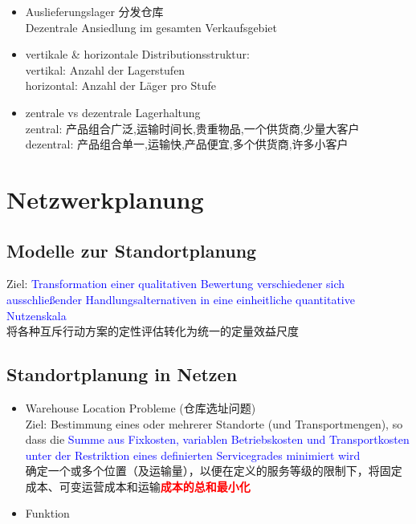 \documentclass[12pt, letterpaper]{article}
\begin{document}
\begin{CJK*}{UTF8}{gbsn}
\begin{itemize}
\item Auslieferungslager 分发仓库\\
Dezentrale Ansiedlung im gesamten Verkaufsgebiet\\

\item vertikale \& horizontale Distributionsstruktur:\\[1mm]
vertikal: Anzahl der Lagerstufen\\[1mm]
horizontal: Anzahl der Läger pro Stufe
\item zentrale vs dezentrale Lagerhaltung\\[1mm]
zentral: 产品组合广泛,运输时间长,贵重物品,一个供货商,少量大客户\\[1mm]
dezentral: 产品组合单一,运输快,产品便宜,多个供货商,许多小客户\\
\end{itemize}

\newpage
\section{Netzwerkplanung}
\subsection{Modelle zur Standortplanung}
Ziel: \textcolor{blue}{Transformation einer qualitativen Bewertung verschiedener sich ausschließender Handlungsalternativen in eine einheitliche quantitative Nutzenskala}\\[1mm]
将各种互斥行动方案的定性评估转化为统一的定量效益尺度

\subsection{Standortplanung in Netzen}

\begin{itemize}
\item Warehouse Location Probleme (仓库选址问题)\\[1mm]
Ziel: Bestimmung eines oder mehrerer Standorte (und Transportmengen), so dass die \textcolor{blue}{Summe aus Fixkosten, variablen Betriebskosten und Transportkosten unter der Restriktion eines definierten Servicegrades minimiert wird}\\[1mm]
确定一个或多个位置（及运输量），以便在定义的服务等级的限制下，将固定成本、可变运营成本和运输\textcolor{red}{\textbf{成本的总和最小化}}

\item Funktion


\end{itemize}
\end{CJK*}
\end{document}
